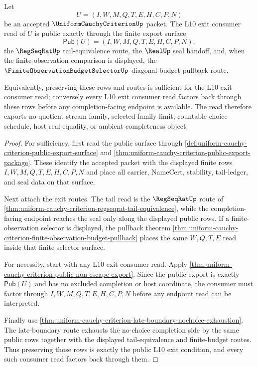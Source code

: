 \begin{theorem}
\label{thm:uniform-cauchy-criterion-l10-exit-public-nonescape}
Let
$$
U=(I,W,M,Q,T,E,H,C,P,N)
$$
be an accepted $\UniformCauchyCriterionUp$ packet. The L10 exit consumer read
of $U$ is public exactly through the finite export surface
$$
\mathsf{Pub}(U)=(I,W,M,Q,T,E,H,C,P,N),
$$
the $\RegSeqRatUp$ tail-equivalence route, the $\RealUp$ seal handoff, and,
when the finite-observation comparison is displayed, the
$\FiniteObservationBudgetSelectorUp$ diagonal-budget pullback route.

Equivalently, preserving these rows and routes is sufficient for the L10 exit
consumer read; conversely every L10 exit consumer read factors back through
these rows before any completion-facing endpoint is available. The read
therefore exports no quotient stream family, selected family limit, countable
choice schedule, host real equality, or ambient completeness object.
\end{theorem}
\begin{proof}
For sufficiency, first read the public surface through
\autoref{def:uniform-cauchy-criterion-public-export-surface} and
\autoref{thm:uniform-cauchy-criterion-public-export-package}. These identify
the accepted packet with the displayed finite rows $I,W,M,Q,T,E,H,C,P,N$ and
place all carrier, NameCert, stability, tail-ledger, and seal data on that
surface.

Next attach the exit routes. The tail read is the
$\RegSeqRatUp$ route of
\autoref{thm:uniform-cauchy-criterion-regseqrat-tail-equivalence}, while the
completion-facing endpoint reaches the seal only along the displayed public
rows. If a finite-observation selector is displayed, the pullback theorem
\autoref{thm:uniform-cauchy-criterion-finite-observation-budget-pullback}
places the same $W,Q,T,E$ read inside that finite selector surface.

For necessity, start with any L10 exit consumer read. Apply
\autoref{thm:uniform-cauchy-criterion-public-non-escape-export}. Since the
public export is exactly $\mathsf{Pub}(U)$ and has no excluded completion or
host coordinate, the consumer must factor through $I,W,M,Q,T,E,H,C,P,N$ before
any endpoint read can be interpreted.

Finally use
\autoref{thm:uniform-cauchy-criterion-late-boundary-nochoice-exhaustion}. The
late-boundary route exhausts the no-choice completion side by the same public
rows together with the displayed tail-equivalence and finite-budget routes.
Thus preserving those rows is exactly the public L10 exit condition, and every
such consumer read factors back through them.
\end{proof}

